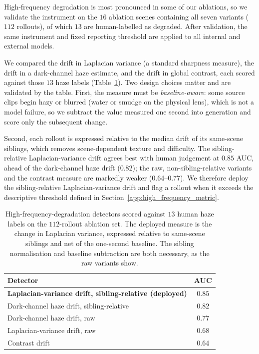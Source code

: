 \documentclass[letterpaper]{article} %
\begin{document}
High-frequency degradation is most pronounced in some of our ablations, so we
validate the instrument on the $16$ ablation scenes containing all seven
variants ($112$ rollouts), of which $13$ are human-labelled as degraded. After
validation, the same instrument and fixed reporting threshold are applied to
all internal and external models.

We compared the drift in Laplacian variance (a standard sharpness measure), the
drift in a dark-channel haze estimate, and the drift in global contrast, each
scored against those $13$ haze labels (Table~\ref{tab:val_hf}). Two design
choices matter and are validated by the table. First, the measure must be
\emph{baseline-aware}: some source clips begin hazy or blurred (water or smudge
on the physical lens), which is not a model failure, so we subtract the value
measured one second into generation and score only the subsequent change.

Second, each rollout is expressed relative to the median drift of its same-scene
siblings, which removes scene-dependent texture and difficulty. The
sibling-relative Laplacian-variance drift agrees best with human judgement at
$0.85$ AUC, ahead of the dark-channel haze drift ($0.82$); the raw,
non-sibling-relative variants and the contrast measure are markedly weaker
($0.64$--$0.77$). We therefore deploy the sibling-relative Laplacian-variance
drift and flag a rollout when it exceeds the descriptive threshold defined in Section~\ref{app:high_frequency_metric}. 

\begin{table}[t]
\centering
{
\small
\begin{tabular}{lc}
\toprule
Detector & AUC \\
\midrule
\textbf{Laplacian-variance drift, sibling-relative (deployed)}
    & $\mathbf{0.85}$ \\
Dark-channel haze drift, sibling-relative
    & $0.82$ \\
Dark-channel haze drift, raw
    & $0.77$ \\
Laplacian-variance drift, raw
    & $0.68$ \\
Contrast drift
    & $0.64$ \\
\bottomrule
\end{tabular}
}
\caption{
    High-frequency-degradation detectors scored against $13$ human haze labels
    on the $112$-rollout ablation set. The deployed measure is the change in
    Laplacian variance, expressed relative to same-scene siblings and net of the
    one-second baseline. The sibling normalisation and baseline subtraction are
    both necessary, as the raw variants show.
}
\label{tab:val_hf}
\end{table}
\end{document}
